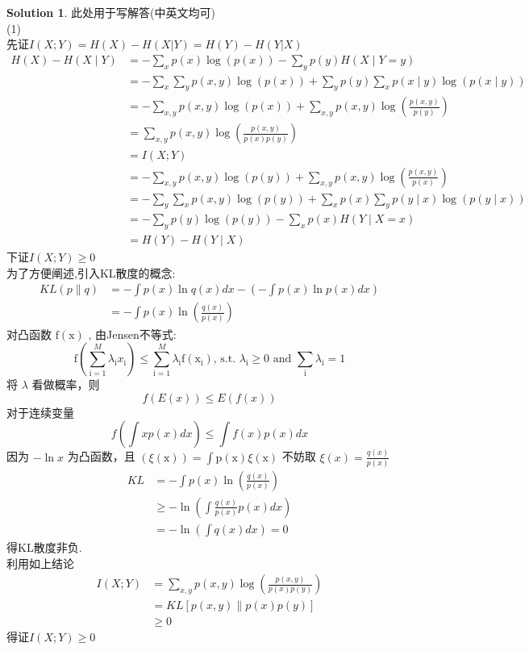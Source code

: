 \documentclass[a4paper,UTF8]{article}
\numberwithin{equation}{section}
\theoremstyle{definition}
\newtheorem*{solution}{Solution}
\begin{document}
\begin{solution}
此处用于写解答(中英文均可)\\
(1)\\
先证$I(X;Y) = H(X) - H(X|Y) = H(Y) - H(Y|X)$
\[
	\begin{aligned}
	H(X)-H(X \mid Y) & =-\sum_x p(x) \log (p(x))-\sum_y p(y) H(X \mid Y=y) \\
	& =-\sum_x \sum_y p(x, y) \log (p(x))+\sum_y p(y) \sum_x p(x \mid y) \log (p(x \mid y)) \\
	& =-\sum_{x, y} p(x, y) \log (p(x))+\sum_{x, y} p(x, y) \log \left(\frac{p(x, y)}{p(y)}\right) \\
	& =\sum_{x, y} p(x, y) \log \left(\frac{p(x, y)}{p(x) p(y)}\right) \\
	& =I(X;Y) \\
	& =-\sum_{x, y} p(x, y) \log (p(y))+\sum_{x, y} p(x, y) \log \left(\frac{p(x, y)}{p(x)}\right) \\
	& =-\sum_y \sum_x p(x, y) \log (p(y))+\sum_x p(x) \sum_y p(y \mid x) \log (p(y \mid x)) \\
	& =-\sum_y p(y) \log (p(y))-\sum_x p(x) H(Y \mid X=x) \\
	& =H(Y)-H(Y \mid X)
	\end{aligned}
\]
下证$I(X;Y)\geqslant 0$\\
为了方便阐述,引入KL散度的概念: 
$$
\begin{aligned}
K L(p \| q) & =-\int p(x) \ln q(x) d x-\left(-\int p(x) \ln p(x) d x\right) \\
& =-\int p(x) \ln \left(\frac{q(x)}{p(x)}\right)
\end{aligned}
$$
对凸函数 $\mathrm{f}(\mathrm{x})$ , 由Jensen不等式:
$$
\mathrm{f}\left(\sum_{\mathrm{i}=1}^M \lambda_{\mathrm{i}} x_{\mathrm{i}}\right) \leq \sum_{\mathrm{i}=1}^M \lambda_{\mathrm{i}} \mathrm{f}\left(\mathrm{x}_{\mathrm{i}}\right) \text {, s.t. } \lambda_{\mathrm{i}} \geq 0 \text { and } \sum_{\mathrm{i}} \lambda_{\mathrm{i}}=1
$$
将 $\lambda$ 看做概率，则
$$
f(E(x)) \leq E(f(x))
$$
对于连续变量
$$
f\left(\int x p(x) d x\right) \leq \int f(x) p(x) d x
$$
因为 $-\ln x$ 为凸函数，且 $(\xi(\mathrm{x}))=\int \mathrm{p}(\mathrm{x}) \xi(\mathrm{x})$
不妨取 $\xi(x)=\frac{q(x)}{p(x)}$
$$
\begin{aligned}
K L & =-\int p(x) \ln \left(\frac{q(x)}{p(x)}\right) \\
& \geq-\ln \left(\int \frac{q(x)}{p(x)} p(x) d x\right) \\
& =-\ln \left(\int q(x) d x\right)=0
\end{aligned}
$$
得KL散度非负.\\
利用如上结论
\[
	\begin{aligned}
		I(X;Y) & = \sum_{x, y} p(x, y) \log \left(\frac{p(x, y)}{p(x) p(y)}\right) \\
		& = K L[p(x,y) \| p(x)p(y)]\\
		& \geqslant 0
	\end{aligned}
\]
得证$I(X;Y)\geqslant 0$\\



\end{solution}
\end{document}
